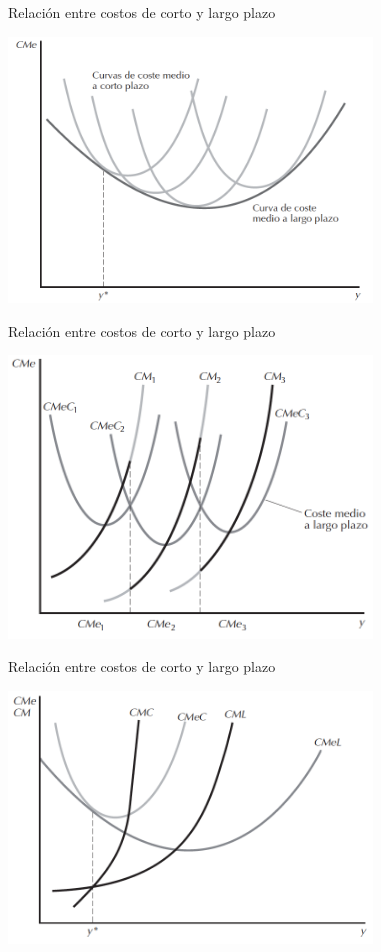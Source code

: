 \documentclass{beamer}
\theoremstyle{definition}
\begin{document}
\begin{frame}{Relaci\'on entre costos de corto y largo plazo}
	\begin{center}
\includegraphics[width=3.8in]{figures4/shortlong2.png}
\end{center}
\end{frame}

\begin{solucion}


\begin{frame}{Relaci\'on entre costos de corto y largo plazo}
	\begin{center}
\includegraphics[width=3.8in]{figures4/shortlong3.png}
\end{center}
\end{frame}

\begin{frame}{Relaci\'on entre costos de corto y largo plazo}
	\begin{center}
\includegraphics[width=3.8in]{figures4/shortlong4.png}
\end{center}
\end{frame}
\end{solucion}
\end{document}
